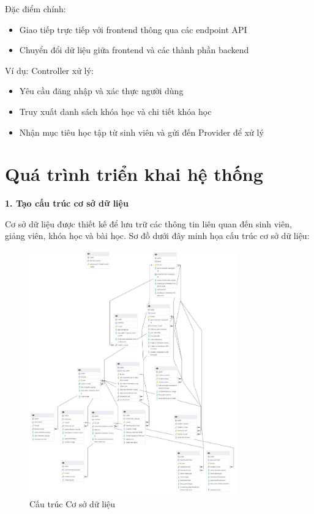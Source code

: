 Đặc điểm chính:

\begin{itemize}
    \item Giao tiếp trực tiếp với frontend thông qua các endpoint API
    \item Chuyển đổi dữ liệu giữa frontend và các thành phần backend
\end{itemize}

Ví dụ: Controller xử lý:

\begin{itemize}
    \item Yêu cầu đăng nhập và xác thực người dùng
    \item Truy xuất danh sách khóa học và chi tiết khóa học
    \item Nhận mục tiêu học tập từ sinh viên và gửi đến Provider để xử lý
\end{itemize}

\section{Quá trình triển khai hệ thống}

\textbf{1. Tạo cấu trúc cơ sở dữ liệu} 

Cơ sở dữ liệu được thiết kế để lưu trữ các thông tin liên quan đến sinh viên, giảng viên, khóa học và bài học. Sơ đồ dưới đây minh họa cấu trúc cơ sở dữ liệu:

\begin{figure}[H]
    \centering
    \includegraphics[width=0.8\textwidth]{Images/Implement/DB_diagram.jpg}
    \caption{Cấu trúc Cơ sở dữ liệu}
\end{figure}

